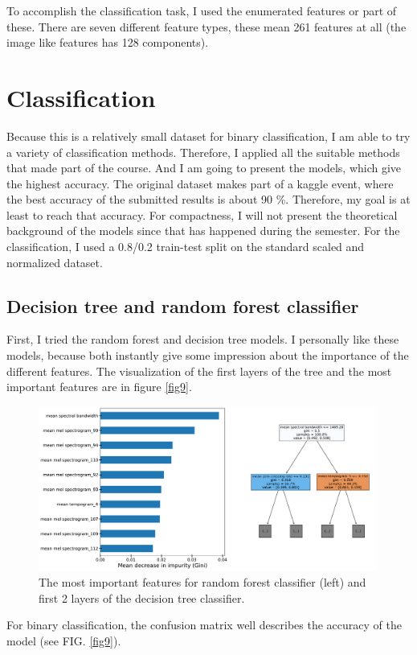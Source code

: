 \documentclass[12pt a4paper]{article}
\numberwithin{equation}{section}
\begin{document}
To accomplish the classification task, I used the enumerated features or part of these. There are seven different feature types, these mean 261 features at all (the image like features has 128 components).

\section{Classification}

Because this is a relatively small dataset for binary classification, I am able to try a variety of classification methods. Therefore,  I applied all the suitable methods that made part of the course. And I am going to present the models, which give the highest accuracy. The original dataset makes part of a kaggle event, where the best accuracy of the submitted results is about 90 \%. Therefore, my goal is at least to reach that accuracy. For compactness, I will not present the theoretical background of the models since that has happened during the semester. For the classification, I used a 0.8/0.2 train-test split on the standard scaled and normalized dataset.

\subsection{Decision tree and random forest classifier}
First, I tried the random forest and decision tree models. I personally like these models, because both instantly give some impression about the importance of the different features. The visualization of the first layers of the tree and the most important features are in figure \ref{fig9}.

\begin{figure}[H]
\centering
\includegraphics[width=0.99\textwidth]{fig/features.pdf}
\caption{The most important features for random forest classifier (left) and first 2 layers of the decision tree classifier.}
\label{fig8}
\end{figure}
For binary classification, the confusion matrix well describes the accuracy of the model (see FIG.  \ref{fig9}).
\end{document}
